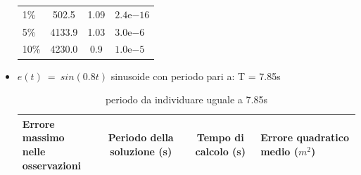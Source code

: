 \documentclass[a4paper,12pt]{report}
\newcommand{\expnumber}[2]{{#1}\mathrm{e}{#2}}
\begin{document}
\begin{itemize}
\begin{table}[H]
\begin{center}
\begin{tabularx}{\textwidth}{p{}SSp{0.5\textwidth}}
          1\% & 502.5 & 1.09 & $\expnumber{2.4}{-16}$\\
          5\% & 4133.9  & 1.03 & $\expnumber{3.0}{-6}$\\
          10\% & 4230.0  & 0.9 & $\expnumber{1.0}{-5}$\\
          \bottomrule
        \end{tabularx}
      \end{center}
    \end{table}




    \item $ e(t)~=~sin(0.8t)$ sinusoide con periodo pari a:
        T = 7.85s



      \begin{table}[H]
        \caption{periodo da individuare uguale a 7.85s}
        \begin{center}
          \label{tab:limiteInfErr}
          \begin{tabularx}{\textwidth}{p{}SSp{0.5\textwidth}}
            \toprule
            {Errore massimo \newline nelle osservazioni} & {Periodo della soluzione (s)} & {Tempo di calcolo (s)} & {Errore quadratico \newline medio ($m^2$)}\\
            \midrule


\end{tabularx}
\end{center}
\end{table}
\end{itemize}
\end{document}
